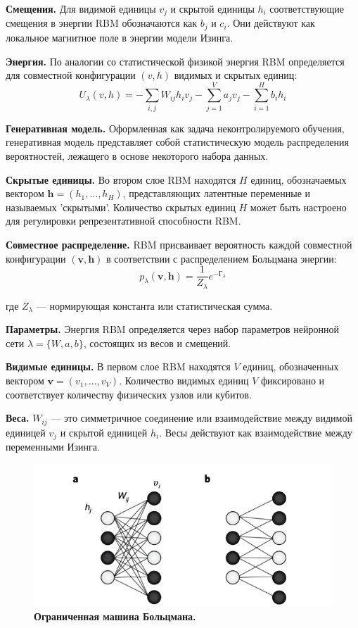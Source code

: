 \textbf{Смещения.} Для видимой единицы \( v_j \) и скрытой единицы \( h_i \) соответствующие смещения в энергии RBM обозначаются как \( b_j \) и \( c_i \). Они действуют как локальное магнитное поле в энергии модели Изинга.

\textbf{Энергия.} По аналогии со статистической физикой энергия RBM определяется для совместной конфигурации \((v,h)\) видимых и скрытых единиц:
\[
U_\lambda(v,h) = - \sum_{i,j} W_{ij} h_i v_j - \sum_{j=1}^{V} a_j v_j - \sum_{i=1}^{H} b_i h_i
\]

\textbf{Генеративная модель.} Оформленная как задача неконтролируемого обучения, генеративная модель представляет собой статистическую модель распределения вероятностей, лежащего в основе некоторого набора данных.

\textbf{Скрытые единицы.} Во втором слое RBM находятся \( H \) единиц, обозначаемых вектором \( \mathbf{h} = (h_1, \ldots, h_H) \), представляющих латентные переменные и называемых 'скрытыми'. Количество скрытых единиц \( H \) может быть настроено для регулировки репрезентативной способности RBM.

\textbf{Совместное распределение.} RBM присваивает вероятность каждой совместной конфигурации \((\mathbf{v}, \mathbf{h})\) в соответствии с распределением Больцмана энергии:
\begin{equation}
p_{\lambda}(\mathbf{v}, \mathbf{h}) = \frac{1}{Z_{\lambda}} e^{-Г_{\lambda}}
\end{equation}

где \( Z_{\lambda} \) — нормирующая константа или статистическая сумма.

\textbf{Параметры.} Энергия RBM определяется через набор параметров нейронной сети \( \lambda = \{W, a, b\} \), состоящих из весов и смещений.

\textbf{Видимые единицы.} В первом слое RBM находятся \( V \) единиц, обозначенных вектором \( \mathbf{v} = (v_1, \ldots, v_V) \). Количество видимых единиц \( V \) фиксировано и соответствует количеству физических узлов или кубитов.

\textbf{Веса.} \( W_{ij} \) — это симметричное соединение или взаимодействие между видимой единицей \( v_j \) и скрытой единицей \( h_i \). Весы действуют как взаимодействие между переменными Изинга.

\begin{figure}[H]
    \centering
    \includegraphics[width=0.8\linewidth]{Images/image4.png}
    \caption{\textbf{Ограниченная машина Больцмана.}}
    \label{fig:rbm}
\end{figure}

